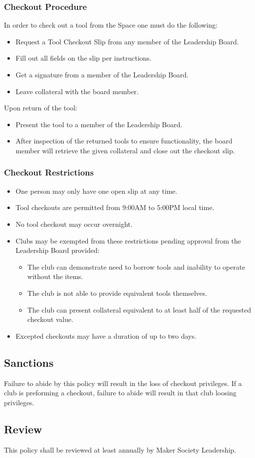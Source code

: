 \documentclass[12pt,letterpaper]{article}
\begin{document}
\subsubsection{Checkout Procedure}
In order to check out a tool from the Space one must do the following: 
\begin{itemize}
    \item Request a Tool Checkout Slip from any member of the Leadership Board.
    \item Fill out all fields on the slip per instructions.
    \item Get a signature from a member of the Leadership Board.
    \item Leave collateral with the board member.
\end{itemize}
Upon return of the tool:
\begin{itemize}
    \item Present the tool to a member of the Leadership Board.
    \item After inspection of the returned tools to ensure functionality,
    the board member will retrieve the given collateral and close out the checkout slip.
\end{itemize}
\subsubsection{Checkout Restrictions}
\begin{itemize}
    \item One person may only have one open slip at any time.
    \item Tool checkouts are permitted from 9:00AM to 5:00PM local time.
    \item No tool checkout may occur overnight.
    \item Clubs may be exempted from these restrictions pending approval from the Leadership Board provided:
    \begin{itemize}
        \item The club can demonstrate need to borrow tools and inability to operate without the items.
        \item The club is not able to provide equivalent tools themselves.
        \item The club can present collateral equivalent to at least half of the requested checkout value.
    \end{itemize}
    \item Excepted checkouts may have a duration of up to two days.
\end{itemize}
\subsection{Sanctions}
Failure to abide by this policy will result in the loss of checkout privileges.
If a club is preforming a checkout, failure to abide will result in that club loosing privileges. 
\subsection{Review}
This policy shall be reviewed at least annually by Maker Society Leadership.






    
\end{document}

